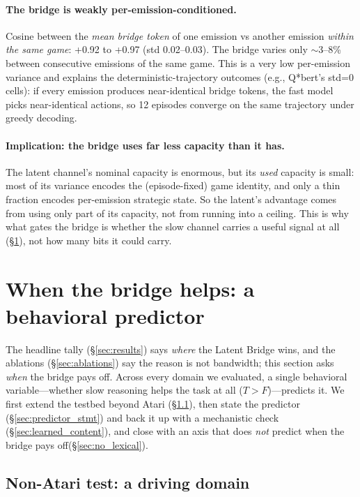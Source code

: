 \documentclass[11pt]{article}
\begin{document}
\paragraph{The bridge is weakly per-emission-conditioned.}
Cosine between the \emph{mean bridge token} of one emission vs another emission \emph{within the same game}: +0.92 to +0.97 (std 0.02--0.03). The bridge varies only $\sim$3--8\% between consecutive emissions of the same game. This is a very low per-emission variance and explains the deterministic-trajectory outcomes (e.g., Q*bert's std=0 cells): if every emission produces near-identical bridge tokens, the fast model picks near-identical actions, so 12 episodes converge on the same trajectory under greedy decoding.

\paragraph{Implication: the bridge uses far less capacity than it has.} The latent channel's nominal capacity is enormous, but its \emph{used} capacity is small: most of its variance encodes the (episode-fixed) game identity, and only a thin fraction encodes per-emission strategic state. So the latent's advantage comes from using only part of its capacity, not from running into a ceiling. This is why what gates the bridge is whether the slow channel carries a useful signal at all (\S\ref{sec:predictor}), not how many bits it could carry.

\section{When the bridge helps: a behavioral predictor}
\label{sec:predictor}

The headline tally (\S\ref{sec:results}) says \emph{where} the Latent Bridge wins, and the
ablations (\S\ref{sec:ablations}) say the reason is not bandwidth; this section asks
\emph{when} the bridge pays off. Across every domain we evaluated, a single behavioral
variable---whether slow reasoning helps the task at all ($T\!>\!F$)---predicts it. We first
extend the testbed beyond Atari (\S\ref{sec:metadrive}), then state the predictor
(\S\ref{sec:predictor_stmt}) and back it up with a mechanistic check (\S\ref{sec:learned_content}),
and close with an axis that does \emph{not} predict when the bridge pays off(\S\ref{sec:no_lexical}).

\subsection{Non-Atari test: a driving domain}
\label{sec:metadrive}
\end{document}

